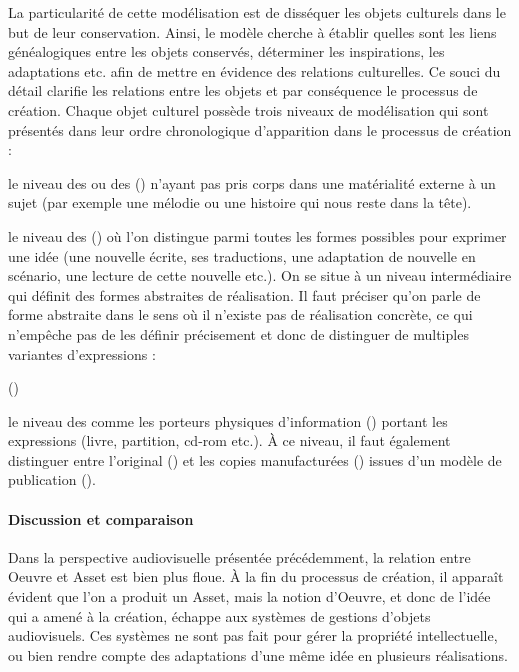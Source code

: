 La particularité de cette modélisation est de disséquer les objets culturels dans le but de leur conservation.
Ainsi, le modèle cherche à établir quelles sont les liens généalogiques entre les objets conservés, déterminer les inspirations, les adaptations etc. afin de mettre en évidence des relations culturelles.
Ce souci du détail clarifie les relations entre les objets et par conséquence le processus de création. 
Chaque objet culturel possède trois niveaux de modélisation qui sont présentés dans leur ordre chronologique d'apparition dans le processus de création :
\begin{liste}
	\item le niveau des  ou des  () n’ayant pas pris corps dans une matérialité externe à un sujet (par exemple une mélodie ou une histoire qui nous reste dans la tête). 

	\item le niveau des  () où l'on distingue parmi toutes les formes possibles pour exprimer une idée (une nouvelle écrite, ses traductions, une adaptation de nouvelle en scénario, une lecture de cette nouvelle etc.).
	On se situe à un niveau intermédiaire qui définit des formes abstraites de  réalisation.
	Il faut préciser qu'on parle de forme abstraite dans le sens où il n'existe pas de réalisation concrète, ce qui n'empêche pas de les définir précisement et donc de distinguer de multiples variantes d'expressions :

	 (\cite{Aalberg2008})
	
	\item le niveau des  comme les porteurs physiques d’information () portant les expressions (livre, partition, cd-rom etc.). 
	À ce niveau, il faut également distinguer entre l’original () et les copies manufacturées () issues d’un modèle de publication (). %
\end{liste}

\paragraph{Discussion et comparaison}
Dans la perspective audiovisuelle présentée précédemment, la relation entre Oeuvre et Asset est bien plus floue.
À la fin du processus de création, il apparaît évident que l'on a produit un Asset, mais la notion d'Oeuvre, et donc de l'idée qui a amené à la création, échappe aux systèmes de gestions d'objets audiovisuels.
Ces systèmes ne sont pas fait pour gérer la propriété intellectuelle, ou bien rendre compte des adaptations d'une même idée en plusieurs réalisations.

